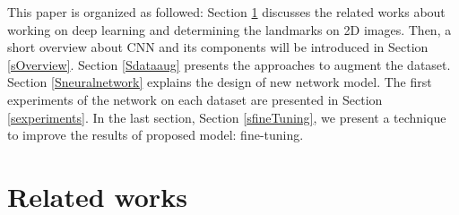 \documentclass[review]{elsarticle}
\begin{document}
\fi
This paper is organized as followed: Section \ref{related_works} discusses the related works about working on deep learning and determining the landmarks on 2D images. Then, a short overview about CNN and its components will be introduced in Section \ref{sOverview}. Section \ref{Sdataaug} presents the approaches to augment the dataset. Section \ref{Sneuralnetwork} explains the design of new network model. The first experiments of the network on each dataset are presented in Section \ref{sexperiments}. In the last section, Section \ref{sfineTuning}, we present a technique to improve the results of proposed model: fine-tuning.


\section{Related works}
\label{related_works}
\end{document}
